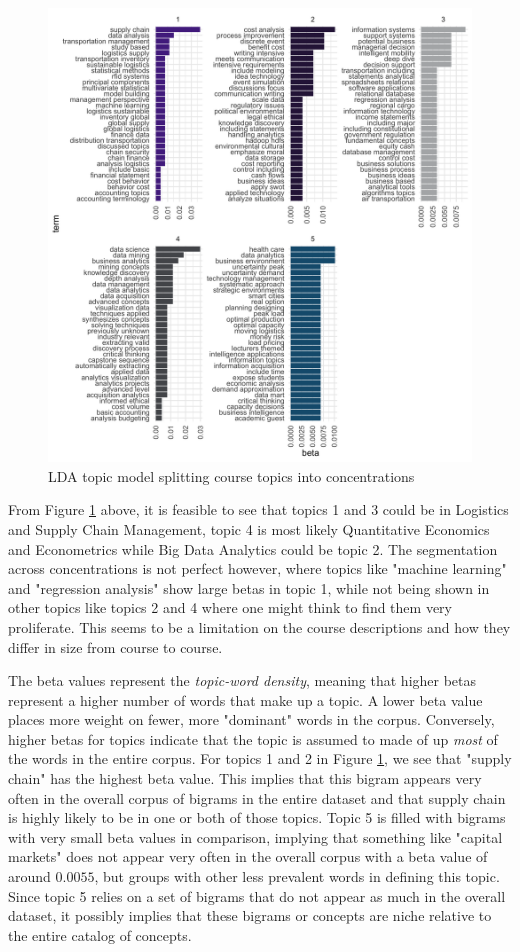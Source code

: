 \begin{figure}[H]
\centering

\includegraphics[width = .9\textwidth, height = .8\textheight]{Content/images/lda.png}
\caption{LDA topic model splitting course topics into concentrations}
\label{fig:lda}
\end{figure}

From Figure \ref{fig:lda} above, it is feasible to see that topics 1 and 3 could be in Logistics and Supply Chain Management, topic 4 is most likely Quantitative 
Economics and Econometrics while Big Data Analytics could be topic 2. The segmentation across concentrations is not perfect however, where topics like "machine 
learning" and "regression analysis" show large betas in topic 1, while not being shown in other topics like topics 2 and 4 where one might think to find them 
very proliferate. This seems to be a limitation on the course descriptions and how they differ in size from course to course.  

The beta values represent the \textit{topic-word density}, meaning that higher betas represent a higher number of words that make up a topic.  A lower beta value 
places more weight on fewer, more "dominant" words in the corpus.  Conversely,  higher betas for topics indicate that the topic is assumed to made of up \textit{most} 
of the words in the entire corpus.  For topics 1 and 2 in Figure \ref{fig:lda}, we see that "supply chain" has the highest beta value. This implies that this bigram 
appears very often in the overall corpus of bigrams in the entire dataset and that supply chain is highly likely to be in one or both of those topics.  Topic 5 is 
filled with bigrams with very small beta values in comparison,  implying that something like "capital markets" does not appear very often in the overall corpus 
with a beta value of around $0.0055$,  but groups with other less prevalent words in defining this topic.  Since topic 5 relies on a set of bigrams that do not 
appear as much in the overall dataset, it possibly implies that these bigrams or concepts are niche relative to the entire catalog of concepts.


